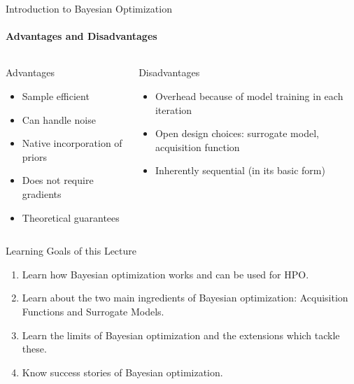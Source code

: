 \begin{frame}[c]{Introduction to Bayesian Optimization}
\framesubtitle{Advantages and Disadvantages}

\begin{columns}[T] %
\begin{column}{.48\textwidth}


\begin{block}{Advantages}
\begin{itemize}
  \item Sample efficient 
  \item Can handle noise
  \item Native incorporation of priors 
  \item Does not require gradients 
  \item Theoretical guarantees
\end{itemize}
\end{block}

\end{column}%

\hfill%
\pause 
\begin{column}{.48\textwidth}

\begin{block}{Disadvantages}
\begin{itemize}
  \item Overhead because of model training in each iteration 
  \item Open design choices: surrogate model, acquisition function
  \item Inherently sequential (in its basic form)
\end{itemize}
\end{block}

\end{column}
\end{columns}

\end{frame}
\begin{frame}[c]{Learning Goals of this Lecture}

\begin{enumerate}
    \item Learn how Bayesian optimization works and can be used for HPO.
    \item Learn about the two main ingredients of Bayesian optimization: Acquisition Functions and Surrogate Models.
    \item Learn the limits of Bayesian optimization and the extensions which tackle these.
    \item Know success stories of Bayesian optimization.
\end{enumerate}

\end{frame}

